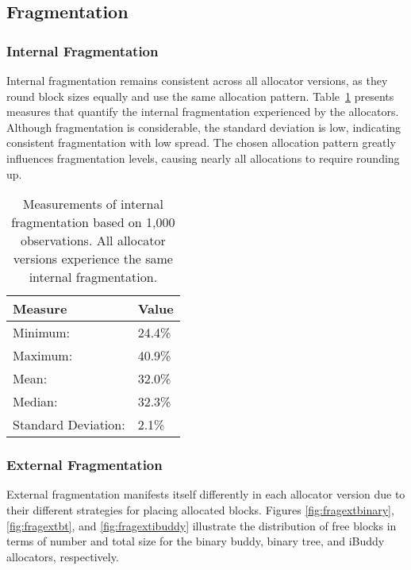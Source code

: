 \FloatBarrier
\subsection{Fragmentation}
\subsubsection{Internal Fragmentation}
Internal fragmentation remains consistent across all allocator versions, as they round block sizes equally and use the same allocation pattern. Table~\ref{table:fraginternal} presents measures that quantify the internal fragmentation experienced by the allocators. Although fragmentation is considerable, the standard deviation is low, indicating consistent fragmentation with low spread. The chosen allocation pattern greatly influences fragmentation levels, causing nearly all allocations to require rounding up.

\begin{table}[h]
    \begin{tabular}{|l|l|}
        \hline
        \textbf{Measure}    & \textbf{Value} \\ \hline
        Minimum:            & 24.4\%         \\ \hline
        Maximum:            & 40.9\%         \\ \hline
        Mean:               & 32.0\%         \\ \hline
        Median:             & 32.3\%         \\ \hline
        Standard Deviation: & 2.1\%          \\ \hline
    \end{tabular}
    \centering
    \caption{Measurements of internal fragmentation based on 1,000 observations. All allocator versions experience the same internal fragmentation.}
    \label{table:fraginternal}
\end{table}

\subsubsection{External Fragmentation}
External fragmentation manifests itself differently in each allocator version due to their different strategies for placing allocated blocks. Figures \ref{fig:fragextbinary}, \ref{fig:fragextbt}, and \ref{fig:fragextibuddy} illustrate the distribution of free blocks in terms of number and total size for the binary buddy, binary tree, and iBuddy allocators, respectively.

